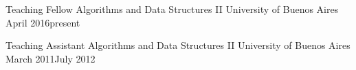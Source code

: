 


\begin{jobitems}

  \jobitem
    {Teaching Fellow} %
    {Algorithms and Data Structures II} %
    {University of Buenos Aires} %
    {April 2016}{present} %

  \jobitem
    {Teaching Assistant} %
    {Algorithms and Data Structures II} %
    {University of Buenos Aires} %
    {March 2011}{July 2012} %

\end{jobitems}
